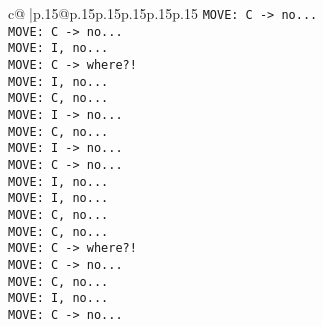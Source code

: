 \documentclass{article}
\begin{document}
{\begin{supertabular}{c@{$\;$}|p{.15\linewidth}@{}p{.15\linewidth}p{.15\linewidth}p{.15\linewidth}p{.15\linewidth}p{.15\linewidth}}
{{{ \tt  MOVE: C -> no...\\ \tt  MOVE: C -> no...\\ \tt  MOVE: I, no...\\ \tt  MOVE: C -> where?!\\ \tt  MOVE: I, no...\\ \tt  MOVE: C, no...\\ \tt  MOVE: I -> no...\\ \tt  MOVE: C, no...\\ \tt  MOVE: I -> no...\\ \tt  MOVE: C -> no...\\ \tt  MOVE: I, no...\\ \tt  MOVE: I, no...\\ \tt  MOVE: C, no...\\ \tt  MOVE: C, no...\\ \tt  MOVE: C -> where?!\\ \tt  MOVE: C -> no...\\ \tt  MOVE: C, no...\\ \tt  MOVE: I, no...\\ \tt  MOVE: C -> no...\\ }}}
\end{supertabular}}
\end{document}
